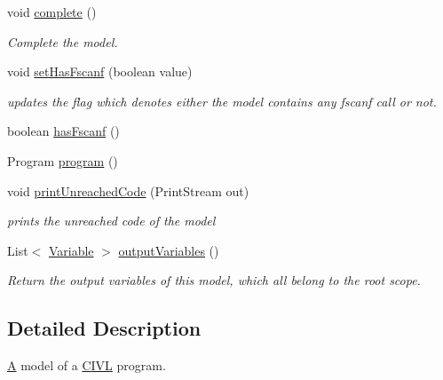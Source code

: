 \begin{DoxyCompactItemize}
void \hyperlink{classedu_1_1udel_1_1cis_1_1vsl_1_1civl_1_1model_1_1common_1_1CommonModel_a0aab6480dc0ec6145925cfd4372c8e2f}{complete} ()
\begin{DoxyCompactList}\small\item\em Complete the model. \end{DoxyCompactList}\item 
void \hyperlink{classedu_1_1udel_1_1cis_1_1vsl_1_1civl_1_1model_1_1common_1_1CommonModel_a44a6d258d8b4d5658af82fef896a0a94}{set\+Has\+Fscanf} (boolean value)
\begin{DoxyCompactList}\small\item\em updates the flag which denotes either the model contains any fscanf call or not. \end{DoxyCompactList}\item 
boolean \hyperlink{classedu_1_1udel_1_1cis_1_1vsl_1_1civl_1_1model_1_1common_1_1CommonModel_a3b7c7baf6c06ffc4b0cc150ff03da847}{has\+Fscanf} ()
\item 
Program \hyperlink{classedu_1_1udel_1_1cis_1_1vsl_1_1civl_1_1model_1_1common_1_1CommonModel_a749b7fa3ee66cce5235a9482befc3d02}{program} ()
\item 
void \hyperlink{classedu_1_1udel_1_1cis_1_1vsl_1_1civl_1_1model_1_1common_1_1CommonModel_af1bc021a2c4bfd02ef7975b15616995f}{print\+Unreached\+Code} (Print\+Stream out)
\begin{DoxyCompactList}\small\item\em prints the unreached code of the model \end{DoxyCompactList}\item 
List$<$ \hyperlink{interfaceedu_1_1udel_1_1cis_1_1vsl_1_1civl_1_1model_1_1IF_1_1variable_1_1Variable}{Variable} $>$ \hyperlink{classedu_1_1udel_1_1cis_1_1vsl_1_1civl_1_1model_1_1common_1_1CommonModel_a92503760c61114ba207e08a4a5287f21}{output\+Variables} ()
\begin{DoxyCompactList}\small\item\em Return the output variables of this model, which all belong to the root scope. \end{DoxyCompactList}\end{DoxyCompactItemize}


\subsection{Detailed Description}
\hyperlink{structA}{A} model of a \hyperlink{classedu_1_1udel_1_1cis_1_1vsl_1_1civl_1_1CIVL}{C\+I\+V\+L} program. 


